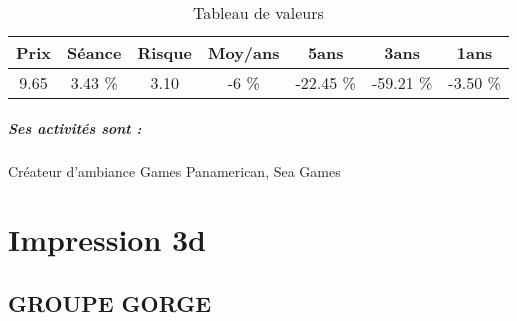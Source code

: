 \documentclass[11pt,a4paper]{report}%
\begin{document}
\begin{table}[H]
  \centering
    \begin{tabular}{|c|c|c|c|c|c|c|}
    \hline
    Prix & Séance & Risque  & Moy/ans & 5ans & 3ans & 1ans \\
    \hline
    9.65 &    3.43 \%    & 3.10 & -6 \% & -22.45 \% & -59.21 \% & -3.50 \% \\
    \hline
    \end{tabular}%
        \label{tab:table_GL EVENTS}%
      \caption{Tableau de valeurs}
\end{table}%

\paragraph{Ses activités sont : } Créateur d’ambiance Games Panamerican, Sea Games 
    
    \newpage\chapter{Impression 3d}


\section{GROUPE GORGE}
\end{document}
